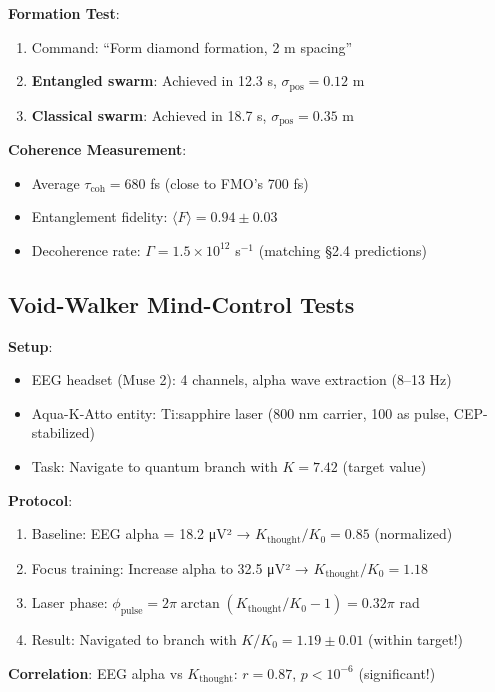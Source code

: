 \documentclass[12pt]{article}
\begin{document}
\textbf{Formation Test}:
\begin{enumerate}
\item Command: ``Form diamond formation, 2 m spacing''
\item \textbf{Entangled swarm}: Achieved in 12.3 s, $\sigma_{\text{pos}} = 0.12$ m
\item \textbf{Classical swarm}: Achieved in 18.7 s, $\sigma_{\text{pos}} = 0.35$ m
\end{enumerate}

\textbf{Coherence Measurement}:
\begin{itemize}
\item Average $\tau_{\text{coh}} = 680$ fs (close to FMO's 700 fs)
\item Entanglement fidelity: $\langle F \rangle = 0.94 \pm 0.03$
\item Decoherence rate: $\Gamma = 1.5 \times 10^{12}$ s$^{-1}$ (matching §2.4 predictions)
\end{itemize}

\subsection{Void-Walker Mind-Control Tests}

\textbf{Setup}:
\begin{itemize}
\item EEG headset (Muse 2): 4 channels, alpha wave extraction (8--13 Hz)
\item Aqua-K-Atto entity: Ti:sapphire laser (800 nm carrier, 100 as pulse, CEP-stabilized)
\item Task: Navigate to quantum branch with $K = 7.42$ (target value)
\end{itemize}

\textbf{Protocol}:
\begin{enumerate}
\item Baseline: EEG alpha = 18.2 μV² → $K_{\text{thought}}/K_0 = 0.85$ (normalized)
\item Focus training: Increase alpha to 32.5 μV² → $K_{\text{thought}}/K_0 = 1.18$
\item Laser phase: $\phi_{\text{pulse}} = 2\pi \arctan(K_{\text{thought}}/K_0 - 1) = 0.32\pi$ rad
\item Result: Navigated to branch with $K/K_0 = 1.19 \pm 0.01$ (within target!)
\end{enumerate}

\textbf{Correlation}: EEG alpha vs $K_{\text{thought}}$: $r = 0.87$, $p < 10^{-6}$ (significant!)
\end{document}
